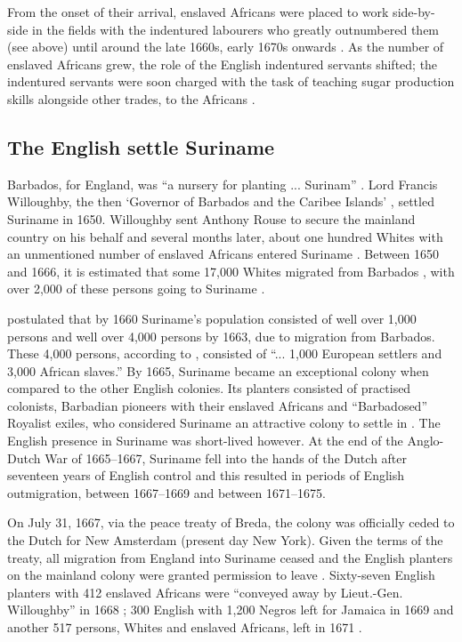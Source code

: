 From the onset of their arrival, enslaved Africans were placed to work side-by-side in the fields with the indentured labourers who greatly outnumbered them (see  above) until around the late 1660s, early 1670s onwards \citep{Davies74, Blackburn98, Galenson02, Elliott07, Bannet11}. As the number of enslaved Africans grew, the role of the English indentured servants shifted; the indentured servants were soon charged with the task of teaching sugar production skills alongside other trades, to the Africans \citep{Galenson02}.

\subsection{The English settle Suriname}\label{6.1.3}
Barbados, for England, was ``a nursery for planting ... Surinam'' \citep{Sainsbury80}. Lord Francis Willoughby, the then `Governor of Barbados and the Caribee Islands' \citep{Hotton74}, settled Suriname in 1650. Willoughby sent Anthony Rouse to secure the mainland country on his behalf and several months later, about one hundred Whites with an unmentioned number of enslaved Africans entered Suriname \citep{Kambel99}. Between 1650 and 1666, it is estimated that some 17,000 Whites migrated from Barbados \citep{Hornsby05}, with over 2,000 of these persons going to Suriname \citep{Campbell86}.

\citet{Campbell86} postulated that by 1660 Suriname's population consisted of well over 1,000 persons and well over 4,000 persons by 1663, due to migration from Barbados. These 4,000 persons, according to \citet[44]{Jacobs09}, consisted of ``... 1,000 European settlers and 3,000 African slaves.'' By 1665, Suriname became an exceptional colony when compared to the other English colonies. Its planters consisted of practised colonists, Barbadian pioneers with their enslaved Africans and {``Barbadosed''} Royalist exiles, who considered Suriname an attractive colony to settle in \citep{Harlow26, Pugh57, Wheeler02, Arbell02, Manning06}. The English presence in Suriname was short-lived however. At the end of the Anglo-Dutch War of 1665--1667, Suriname fell into the hands of the Dutch after seventeen years of English control and this resulted in periods of English outmigration, between 1667--1669 and between 1671--1675.

On July 31, 1667, via the peace treaty of Breda, the colony was officially ceded to the Dutch for New Amsterdam (present day New York). Given the terms of the treaty, all migration from England into Suriname ceased and the English planters on the mainland colony were granted permission to leave \citep{Arbell02}. Sixty-seven English planters with 412 enslaved Africans were ``conveyed away by Lieut.-Gen. Willoughby'' in 1668 \citep[no. 1759 II]{Sainsbury80}; 300 English with 1,200 Negros left for Jamaica in 1669 \citep{Sainsbury89, Griffiths97} and another 517 persons, Whites and enslaved Africans, left in 1671 \citep{Sainsbury80}.

